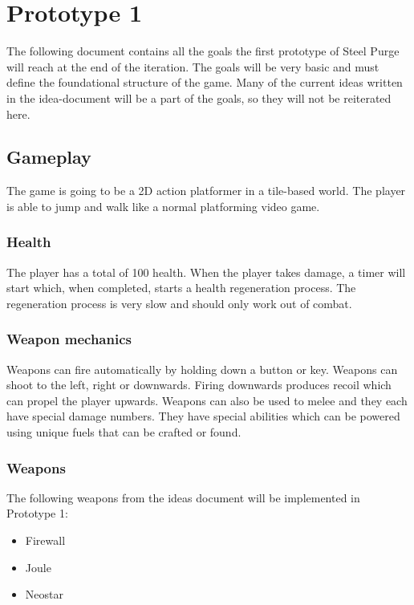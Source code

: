 \documentclass[../Main.tex]{subfiles}
\begin{document}
\section{Prototype 1}

The following document contains all the goals the first prototype of Steel Purge will reach at the end of the iteration. The goals will be very basic and must define the foundational structure of the game. Many of the current ideas written in the idea-document will be a part of the goals, so they will not be reiterated here.

\subsection{Gameplay}

The game is going to be a 2D action platformer in a tile-based world. The player is able to jump and walk like a normal platforming video game.

\subsubsection{Health}

The player has a total of 100 health. When the player takes damage, a timer will start which, when completed, starts a health regeneration process. The regeneration process is very slow and should only work out of combat. 

\subsubsection{Weapon mechanics}

Weapons can fire automatically by holding down a button or key. Weapons can shoot to the left, right or downwards. Firing downwards produces recoil which can propel the player upwards. Weapons can also be used to melee and they each have special damage numbers. They have special abilities which can be powered using unique fuels that can be crafted or found. 

\subsubsection{Weapons}

The following weapons from the ideas document will be implemented in Prototype 1:

\begin{itemize}
	\item Firewall
	\item Joule
	\item Neostar
\end{itemize}
\end{document}
